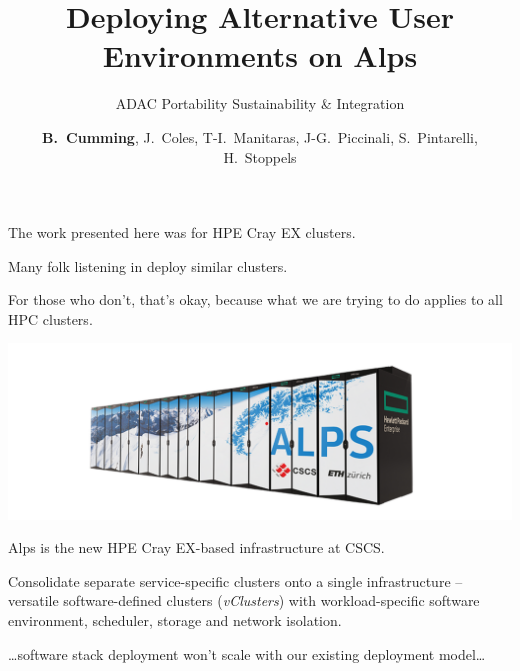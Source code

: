 \documentclass[aspectratio=43]{beamer}
\author{
    \textbf{B.~Cumming},
    J.~Coles,
    T-I.~Manitaras,
    J-G.~Piccinali,
    S.~Pintarelli,
    H.~Stoppels}
\title{\centering Deploying Alternative User Environments on Alps}
\subtitle{ADAC Portability Sustainability \& Integration}
\begin{document}
\setlength{}
\setlength\leftmargini{\dimexpr\leftmargini - 1.0em\relax}

\cscstitle

\begin{frame}[fragile]{}
    \begin{center}
    \vspace{15pt}

    The work presented here was for HPE Cray EX clusters.

    \vspace{15pt}

    Many folk listening in deploy similar clusters.

    \vspace{15pt}

    For those who don't, that's okay, because what we are trying to do applies to all HPC clusters.

    \end{center}

\end{frame}

\begin{frame}[fragile]{}
    \vspace{-60pt}
    \begin{center}
    \includegraphics[width=\textwidth]{images/alps.png}

    Alps is the new HPE Cray EX-based infrastructure at CSCS.

    \vspace{15pt}

    Consolidate separate service-specific clusters onto a single infrastructure -- versatile software-defined clusters (\emph{vClusters}) with workload-specific software environment, scheduler, storage and network isolation.

    \vspace{15pt}

    \dots software stack deployment won't scale with our existing deployment model\dots

    \end{center}

\end{frame}
\end{document}
